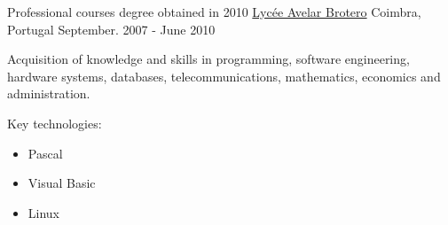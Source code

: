 \begin{cventries}
\cventry
{Professional courses degree obtained in 2010} %
{\href{http://www.brotero.pt/}{Lycée Avelar Brotero}} %
{Coimbra, Portugal} %
{September. 2007 - June 2010} %
{  %
\begin{cvitems}
\item {Acquisition of knowledge and skills in programming, software engineering, hardware systems, databases, telecommunications, mathematics, economics and administration.}
\item{Key technologies:}
\begin{itemize}
\item Pascal
\item Visual Basic
\item Linux
\end{itemize}
\end{cvitems}
}



\end{cventries}

\pagebreak